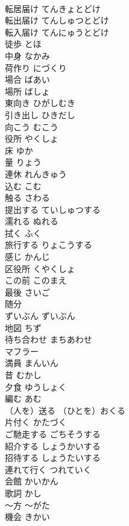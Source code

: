\documentclass[8pt]{extreport}
\begin{document}
\begin{CJK}{UTF8}{min}
\\	転居届け	てんきょとどけ	
\\	転出届け	てんしゅつとどけ	
\\	転入届け	てんにゅうとどけ	
\\	徒歩	とほ	
\\	中身	なかみ	
\\	荷作り	にづくり	
\\	場合	ばあい	
\\	場所	ばしょ	
\\	東向き	ひがしむき	
\\	引き出し	ひきだし	
\\	向こう	むこう	
\\	役所	やくしょ	
\\	床	ゆか	
\\	量	りょう	
\\	連休	れんきゅう	
\\	込む	こむ	
\\	触る	さわる	
\\	提出する	ていしゅつする	
\\	濡れる	ぬれる	
\\	拭く	ふく	
\\	旅行する	りょこうする	
\\	感じ	かんじ	
\\	区役所	くやくしょ	
\\	この前	このまえ	
\\	最後	さいご	
\\	随分
\\	ずいぶん	ずいぶん
\\	地図	ちず	
\\	待ち合わせ	まちあわせ	
\\	マフラー		
\\	満員	まんいん	
\\	昔	むかし	
\\	夕食	ゆうしょく	
\\	編む	あむ	
\\	（人を）送る	（ひとを）おくる	
\\	片付く	かたづく	
\\	ご馳走する	ごちそうする
\\	紹介する	しょうかいする	
\\	招待する	しょうたいする	
\\	連れて行く	つれていく	
\\	会館	かいかん	
\\	歌詞	かし	
\\	〜方	〜がた	
\\	機会	きかい	

\end{CJK}
\end{document}
